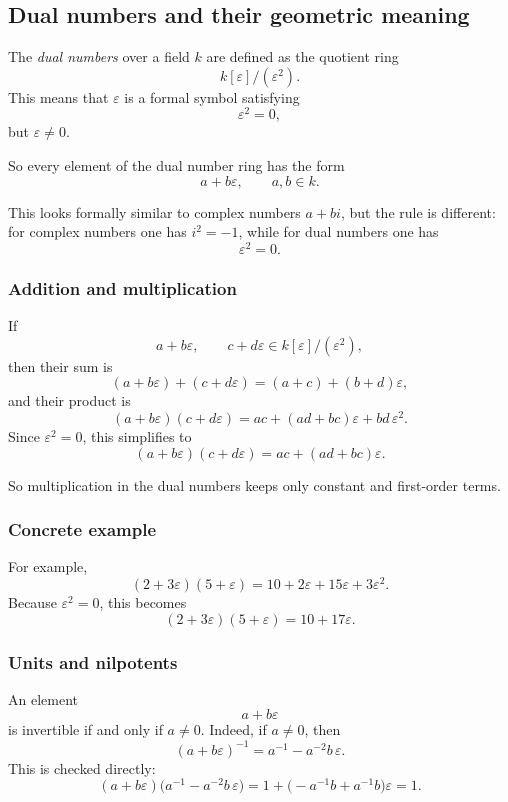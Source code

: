 \documentclass[12pt,a4paper]{article}
\theoremstyle{plain}
\theoremstyle{definition}      %
\begin{document}
	\subsection*{Dual numbers and their geometric meaning}
	
	The \emph{dual numbers} over a field \(k\) are defined as the quotient ring
	\[
	k[\varepsilon]/(\varepsilon^2).
	\]
	This means that \(\varepsilon\) is a formal symbol satisfying
	\[
	\varepsilon^2=0,
	\]
	but \(\varepsilon\neq 0\).
	
	So every element of the dual number ring has the form
	\[
	a+b\varepsilon,
	\qquad a,b\in k.
	\]
	
	This looks formally similar to complex numbers \(a+bi\), but the rule is different:
	for complex numbers one has \(i^2=-1\), while for dual numbers one has
	\[
	\varepsilon^2=0.
	\]
	
	\subsubsection*{Addition and multiplication}
	
	If
	\[
	a+b\varepsilon,\qquad c+d\varepsilon\in k[\varepsilon]/(\varepsilon^2),
	\]
	then their sum is
	\[
	(a+b\varepsilon)+(c+d\varepsilon)=(a+c)+(b+d)\varepsilon,
	\]
	and their product is
	\[
	(a+b\varepsilon)(c+d\varepsilon)=ac+(ad+bc)\varepsilon+b d\,\varepsilon^2.
	\]
	Since \(\varepsilon^2=0\), this simplifies to
	\[
	(a+b\varepsilon)(c+d\varepsilon)=ac+(ad+bc)\varepsilon.
	\]
	
	So multiplication in the dual numbers keeps only constant and first-order terms.
	
	\subsubsection*{Concrete example}
	
	For example,
	\[
	(2+3\varepsilon)(5+\varepsilon)
	=
	10+2\varepsilon+15\varepsilon+3\varepsilon^2.
	\]
	Because \(\varepsilon^2=0\), this becomes
	\[
	(2+3\varepsilon)(5+\varepsilon)=10+17\varepsilon.
	\]
	
	\subsubsection*{Units and nilpotents}
	
	An element
	\[
	a+b\varepsilon
	\]
	is invertible if and only if \(a\neq 0\). Indeed, if \(a\neq 0\), then
	\[
	(a+b\varepsilon)^{-1}=a^{-1}-a^{-2}b\,\varepsilon.
	\]
	This is checked directly:
	\[
	(a+b\varepsilon)\bigl(a^{-1}-a^{-2}b\,\varepsilon\bigr)
	=
	1+\bigl(-a^{-1}b+a^{-1}b\bigr)\varepsilon
	=
	1.
	\]
	
\end{document}
